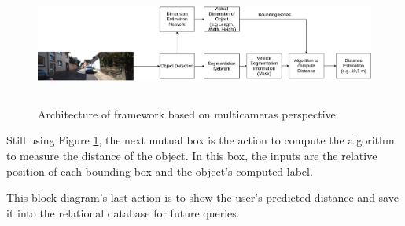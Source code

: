 \begin{figure}[H]
\centering
\includegraphics[width=\textwidth,height=40mm]{imagens/Network Behavior.png}
\caption{Architecture of framework based on multicameras perspective}
\label{fig:networkBehavior}
\end{figure}

Still using Figure \ref{fig:networkBehavior}, the next mutual box is the action to compute the algorithm to measure the distance of the object. In this box, the inputs are the relative position of each bounding box and the object's computed label. 

This block diagram's last action is to show the user's predicted distance and save it into the relational database for future queries. 